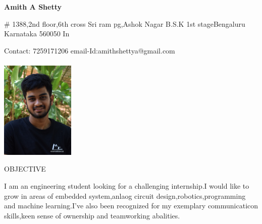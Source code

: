 \documentclass[10pt]{article}
\begin{document}
	

	
	\begin{center}
		\bfseries{\large Amith A Shetty}
	\end{center}


	\noindent\makebox[\linewidth]{\rule{\textwidth}{1.8pt}}
	
	


		\begin{minipage}[t][6cm][t]{0.7\textwidth}
		   \# 1388,2nd floor,6th cross  
			\newline  Sri ram pg,Ashok Nagar   
			\newline  B.S.K 1st stageBengaluru 
			\newline  Karnataka 560050
			\newline  In
			
	    \end{minipage}
		\begin{minipage}[t][6cm][t]{0.3\textwidth}
		
		  Contact: 7259171206 
		  \newline email-Id:amithshettya@gmail.com
		  \\ \\
			\newline \includegraphics[width=100pt]{amith_profile.JPG}
		\end{minipage}

	

	
	\vspace{5em}
	
		\begin{minipage}[t][2cm][t]{0.2\textwidth}
		OBJECTIVE
		
	\end{minipage}
	\begin{minipage}[t][2cm][t]{0.8\textwidth}
		I am an engineering student looking for a challenging internship.I would like to grow in areas of embedded system,anlaog circuit design,robotics,programming and machine learning.I've also been recognized for my exemplary communicaticon skills,keen sense of ownership and teamworking abalities.
		
	\end{minipage}
	
\end{document}
